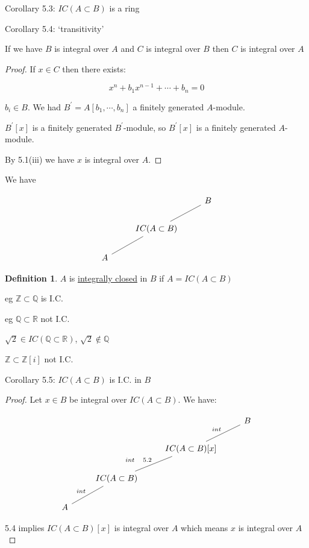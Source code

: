 \documentclass{article}
\theoremstyle{definition}
\newtheorem{definition}{Definition}
\begin{document}
Corollary 5.3: \(IC (A \subset B)\)  is a ring

Corollary 5.4: `transitivity'

If we have \(B\) is integral over \(A\) and \(C\) is integral over \(B\) then \(C\) is integral over \(A\) 

\begin{proof}
    If \(x\in C\) then there exists:

    \[
        x^n + b_1 x^{n-1} + \cdots + b_n = 0 
    \]

    \(b_i \in B\). We had \(B^{\prime} = A[b_1,\cdots,b_n]\) a finitely generated \(A\)-module.

    \(B^{\prime} [x]\) is a finitely generated \(B^{\prime}\)-module, so \(B^{\prime} [x]\) is a finitely generated \(A\)-module.
    
    By 5.1(iii) we have \(x\) is integral over \(A\).
\end{proof}

We have

\[
    \begin{tikzcd}
        & & B \\
        & IC (A \subset B) \ar[ur, no head] & \\
        A \ar[ur, no head] & &
    \end{tikzcd}
\]

\begin{definition}
    \(A\) is \underline{integrally closed} in \(B\) if \(A = IC (A \subset B)\) 
\end{definition}

eg \(\mathbb{Z} \subset \mathbb{Q}\) is I.C.

eg \(\mathbb{Q} \subset \mathbb{R}\) not I.C.

\(\sqrt{2}\in IC (\mathbb{Q} \subset \mathbb{R}) \), \(\sqrt{2} \notin \mathbb{Q}\)

\(\mathbb{Z} \subset \mathbb{Z} [i]\) not I.C.

Corollary 5.5: \(IC (A \subset B)\) is I.C. in \(B\) 

\begin{proof}
    Let \(x\in B\) be integral over \(IC (A \subset B)\). We have:
    
    \[
        \begin{tikzcd}
            & & & B\\
            & & IC (A \subset B)[x] \ar[ur, no head, "int"] & \\
            & IC (A \subset B) \ar[ur, no head, "int\quad 5.2"] & & \\
            A \ar[ur, no head, "int"] & & &
        \end{tikzcd}
    \]

    5.4 implies \(IC (A \subset B)[x]\) is integral over \(A\) which means \(x\) is integral over \(A\) 
\end{proof}
\end{document}
